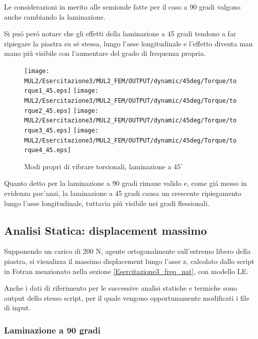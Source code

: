 \documentclass{article}
\begin{document}
        Le considerazioni in merito alle semionde fatte per il caso a 90 gradi valgono anche cambiando la laminazione.

        Si puó peró notare che gli effetti della laminazione a 45 gradi tendono a far ripiegare la piastra
        su sé stessa, lungo l'asse longitudinale e l'effetto diventa man mano piú visibile con l'aumentare del grado di 
        frequenza propria.

        \clearpage

        \begin{figure}[h!]
             \label{fig:freq_nat_torque_45}
            \texttt{[image: MUL2/Esercitazione3/MUL2\_FEM/OUTPUT/dynamic/45deg/Torque/torque1\_45.eps]}
            \texttt{[image: MUL2/Esercitazione3/MUL2\_FEM/OUTPUT/dynamic/45deg/Torque/torque2\_45.eps]}
            \texttt{[image: MUL2/Esercitazione3/MUL2\_FEM/OUTPUT/dynamic/45deg/Torque/torque3\_45.eps]}
            \texttt{[image: MUL2/Esercitazione3/MUL2\_FEM/OUTPUT/dynamic/45deg/Torque/torque4\_45.eps]}
            \caption{Modi propri di vibrare torsionali, laminazione a $45^\circ$}
        \end{figure}

        Quanto detto per la laminazione a 90 gradi rimane valido e, come giá messo in evidenza poc'anzi, 
        la laminazione a 45 gradi causa un crescente ripiegamento lungo l'asse longitudinale, tuttavia piú visibile
        nei gradi flessionali.

        
        

            \clearpage

            \subsection{Analisi Statica: displacement massimo \label{displacement_massimo}}

            Supponendo un carico di 200 N, agente ortogonalmente sull'estremo libero della piastra, si visualizza il massimo displacement
            lungo l'asse z, calcolato dallo script in Fotran menzionato nella sezione \ref{Esercitazione3_freq_nat}, con modello LE.

            Anche i dati di riferimento per le successive analisi statiche e termiche sono output dello stesso script, per il quale vengono opportunamente
            modificati i file di input.

            \subsubsection{Laminazione a 90 gradi \label{displacement_massimo_90}}
\end{document}
